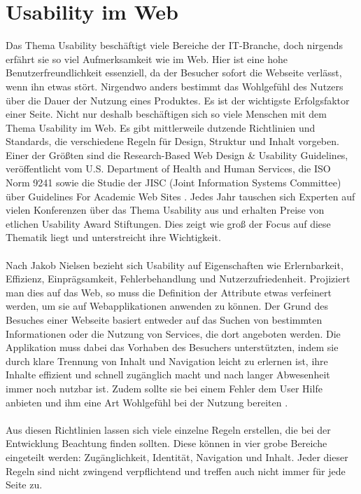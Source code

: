 %
%
%
%


\section{Usability im Web}
Das Thema Usability beschäftigt viele Bereiche der IT-Branche, doch nirgends erfährt sie so viel Aufmerksamkeit wie im Web. Hier ist eine hohe Benutzerfreundlichkeit essenziell, da der Besucher sofort die Webseite verlässt, wenn ihn etwas stört. Nirgendwo anders bestimmt das Wohlgefühl des Nutzers über die Dauer der Nutzung eines Produktes. Es ist der wichtigste Erfolgsfaktor einer Seite. Nicht nur deshalb beschäftigen sich so viele Menschen mit dem Thema Usability im Web. Es gibt mittlerweile dutzende Richtlinien und Standards, die verschiedene Regeln für Design, Struktur und Inhalt vorgeben. Einer der Größten sind die \glqq Research-Based Web  Design \& Usability Guidelines\grqq{}, veröffentlicht vom U.S. Department of Health and Human Services, die ISO Norm 9241 sowie die Studie der JISC (Joint Information Systems Committee) über \glqq Guidelines For Academic Web Sites\grqq{} \cite{isoStandards}. Jedes Jahr tauschen sich Experten auf vielen Konferenzen über das Thema Usability aus und erhalten Preise von etlichen Usability Award Stiftungen. Dies zeigt wie groß der Focus auf diese Thematik liegt und unterstreicht ihre Wichtigkeit.\\
\\
Nach Jakob Nielsen bezieht sich Usability auf Eigenschaften wie Erlernbarkeit, Effizienz, Einprägsamkeit, Fehlerbehandlung und Nutzerzufriedenheit. Projiziert man dies auf das Web, so muss die Definition der Attribute etwas verfeinert werden, um sie auf Webapplikationen anwenden zu können. Der Grund des Besuches einer Webseite basiert entweder auf das Suchen von bestimmten Informationen oder die Nutzung von Services, die dort angeboten werden. Die Applikation muss dabei das Vorhaben des Besuchers unterstützten, indem sie durch klare Trennung von Inhalt und Navigation leicht zu erlernen ist, ihre Inhalte effizient und schnell zugänglich macht und nach langer Abwesenheit immer noch nutzbar ist. Zudem sollte sie bei einem Fehler dem User Hilfe anbieten und ihm eine Art Wohlgefühl bei der Nutzung bereiten \cite{UsabilityPriciples}.\\
\\
Aus diesen Richtlinien lassen sich viele einzelne Regeln erstellen, die bei der Entwicklung Beachtung finden sollten. Diese können in vier grobe Bereiche eingeteilt werden: Zugänglichkeit, Identität, Navigation und Inhalt. Jeder dieser Regeln sind nicht zwingend verpflichtend und treffen auch nicht immer für jede Seite zu.


